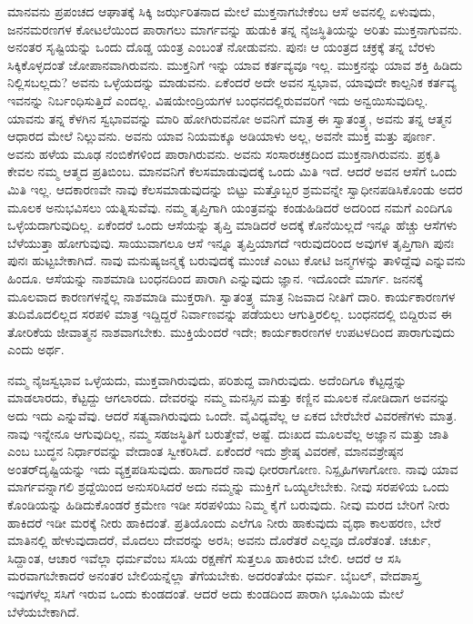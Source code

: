ಮಾನವನು ಪ್ರಪಂಚದ ಆಘಾತಕ್ಕೆ ಸಿಕ್ಕಿ ಜರ್ಝರಿತನಾದ ಮೇಲೆ ಮುಕ್ತನಾಗಬೇಕೆಂಬ ಆಸೆ ಅವನಲ್ಲಿ ಏಳುವುದು, ಜನನಮರಣಗಳ ಕೋಟಲೆಯಿಂದ ಪಾರಾಗಲು ಮಾರ್ಗವನ್ನು ಹುಡುಕಿ ತನ್ನ ನೈಜಸ್ಥಿತಿಯನ್ನು ಅರಿತು ಮುಕ್ತನಾಗುವನು. ಅನಂತರ ಸೃಷ್ಟಿಯನ್ನು ಒಂದು ದೊಡ್ಡ ಯಂತ್ರ ಎಂಬಂತೆ ನೋಡುವನು. ಪುನಃ ಆ ಯಂತ್ರದ ಚಕ್ರಕ್ಕೆ ತನ್ನ ಬೆರಳು ಸಿಕ್ಕಿಕೊಳ್ಳದಂತೆ ಜೋಪಾನವಾಗಿರುವನು. ಮುಕ್ತನಿಗೆ ಇನ್ನು ಯಾವ ಕರ್ತವ್ಯವೂ ಇಲ್ಲ. ಮುಕ್ತನನ್ನು ಯಾವ ಶಕ್ತಿ ಹಿಡಿದು ನಿಲ್ಲಿಸಬಲ್ಲದು? ಅವನು ಒಳ್ಳೆಯದನ್ನು ಮಾಡುವನು. ಏಕೆಂದರೆ ಅದೇ ಅವನ ಸ್ವಭಾವ, ಯಾವುದೇ ಕಾಲ್ಪನಿಕ ಕರ್ತವ್ಯ ಇವನನ್ನು ನಿರ್ಬಂಧಿಸುತ್ತಿದೆ ಎಂದಲ್ಲ. ವಿಷಯೇಂದ್ರಿಯಗಳ ಬಂಧನದಲ್ಲಿರುವವರಿಗೆ ಇದು ಅನ್ವಯಿಸುವುದಿಲ್ಲ. ಯಾವನು ತನ್ನ ಕೆಳಗಿನ ಸ್ವಭಾವವನ್ನು ಮಾರಿ ಹೋಗಿರುವನೋ ಅವನಿಗೆ ಮಾತ್ರ ಈ ಸ್ವಾತಂತ್ರ್ಯ, ಅವನು ತನ್ನ ಆತ್ಮನ ಆಧಾರದ ಮೇಲೆ ನಿಲ್ಲುವನು. ಅವನು ಯಾವ ನಿಯಮಕ್ಕೂ ಅಡಿಯಾಳು ಅಲ್ಲ, ಅವನೇ ಮುಕ್ತ ಮತ್ತು ಪೂರ್ಣ. ಅವನು ಹಳೆಯ ಮೂಢ ನಂಬಿಕೆಗಳಿಂದ ಪಾರಾಗಿರುವನು. ಅವನು ಸಂಸಾರಚಕ್ರದಿಂದ ಮುಕ್ತನಾಗಿರುವನು. ಪ್ರಕೃತಿ ಕೇವಲ ನಮ್ಮ ಆತ್ಮದ ಪ್ರತಿಬಿಂಬ. ಮಾನವನಿಗೆ ಕೆಲಸಮಾಡುವುದಕ್ಕೆ ಒಂದು ಮಿತಿ ಇದೆ. ಆದರೆ ಅವನ ಆಸೆಗೆ ಒಂದು ಮಿತಿ ಇಲ್ಲ. ಆದಕಾರಣವೇ ನಾವು ಕೆಲಸಮಾಡುವುದನ್ನು ಬಿಟ್ಟು ಮತ್ತೊಬ್ಬರ ಶ್ರಮವನ್ನೇ ಸ್ವಾಧೀನಪಡಿಸಿಕೊಂಡು ಅದರ ಮೂಲಕ ಅನುಭವಿಸಲು ಯತ್ನಿಸುವೆವು. ನಮ್ಮ ತೃಪ್ತಿಗಾಗಿ ಯಂತ್ರವನ್ನು ಕಂಡುಹಿಡಿದರೆ ಅದರಿಂದ ನಮಗೆ ಎಂದಿಗೂ ಒಳ್ಳೆಯದಾಗುವುದಿಲ್ಲ. ಏಕೆಂದರೆ ಒಂದು ಆಸೆಯನ್ನು ತೃಪ್ತಿ ಮಾಡಿದರೆ ಅದಕ್ಕೆ ಕೊನೆಯಿಲ್ಲದೆ ಇನ್ನೂ ಹೆಚ್ಚು ಆಸೆಗಳು ಬೆಳೆಯುತ್ತಾ ಹೋಗುವುವು. ಸಾಯುವಾಗಲೂ ಆಸೆ ಇನ್ನೂ ತೃಪ್ತಿಯಾಗದೆ ಇರುವುದರಿಂದ ಅವುಗಳ ತೃಪ್ತಿಗಾಗಿ ಪುನಃ ಪುನಃ ಹುಟ್ಟಬೇಕಾಗಿದೆ. ನಾವು ಮನುಷ್ಯಜನ್ಮಕ್ಕೆ ಬರುವುದಕ್ಕೆ ಮುಂಚೆ ಎಂಟು ಕೋಟಿ ಜನ್ಮಗಳನ್ನು ತಾಳಿದ್ದೆವು ಎನ್ನುವನು ಹಿಂದೂ. ಆಸೆಯನ್ನು ನಾಶಮಾಡಿ ಬಂಧನದಿಂದ ಪಾರಾಗಿ ಎನ್ನುವುದು ಜ್ಞಾನ. ಇದೊಂದೇ ಮಾರ್ಗ. ಜನನಕ್ಕೆ ಮೂಲವಾದ ಕಾರಣಗಳನ್ನೆಲ್ಲ ನಾಶಮಾಡಿ ಮುಕ್ತರಾಗಿ. ಸ್ವಾತಂತ್ರ್ಯ ಮಾತ್ರ ನಿಜವಾದ ನೀತಿಗೆ ದಾರಿ. ಕಾರ್ಯಕಾರಣಗಳ ತುದಿಮೊದಲಿಲ್ಲದ ಸರಪಳಿ ಮಾತ್ರ ಇದ್ದಿದ್ದರೆ ನಿರ್ವಾಣವನ್ನು ಪಡೆಯಲು ಆಗುತ್ತಿರಲಿಲ್ಲ. ಬಂಧನದಲ್ಲಿ ಬಿದ್ದಿರುವ ಈ ತೋರಿಕೆಯ ಜೀವಾತ್ಮನ ನಾಶವಾಗಬೇಕು. ಮುಕ್ತಿಯೆಂದರೆ ಇದೇ; ಕಾರ್ಯಕಾರಣಗಳ ಉಪಟಳದಿಂದ ಪಾರಾಗುವುದು ಎಂದು ಅರ್ಥ.

ನಮ್ಮ ನೈಜಸ್ವಭಾವ ಒಳ್ಳೆಯದು, ಮುಕ್ತವಾಗಿರುವುದು, ಪರಿಶುದ್ದ ವಾಗಿರುವುದು. ಅದೆಂದಿಗೂ ಕೆಟ್ಟದ್ದನ್ನು ಮಾಡಲಾರದು, ಕೆಟ್ಟದ್ದು ಆಗಲಾರದು. ದೇವರನ್ನು ನಮ್ಮ ಮನಸ್ಸಿನ ಮತ್ತು ಕಣ್ಣಿನ ಮೂಲಕ ನೋಡಿದಾಗ ಅವನನ್ನು ಅದು ಇದು ಎನ್ನುವೆವು. ಆದರೆ ಸತ್ಯವಾಗಿರುವುದು ಒಂದೇ. ವೈವಿಧ್ಯವೆಲ್ಲ ಆ ಏಕದ ಬೇರೆಬೇರೆ ವಿವರಣೆಗಳು ಮಾತ್ರ. ನಾವು ಇನ್ನೇನೂ ಆಗುವುದಿಲ್ಲ, ನಮ್ಮ ಸಹಜಸ್ಥಿತಿಗೆ ಬರುತ್ತೇವೆ, ಅಷ್ಟೆ. ದುಃಖದ ಮೂಲವೆಲ್ಲ ಅಜ್ಞಾನ ಮತ್ತು ಜಾತಿ ಎಂಬ ಬುದ್ಧನ ನಿರ್ಧಾರವನ್ನು ವೇದಾಂತ ಸ್ವೀಕರಿಸಿದೆ. ಏಕೆಂದರೆ ಇದು ಶ್ರೇಷ್ಠ ವಿವರಣೆ, ಮಾನವಶ್ರೇಷ್ಠನ ಅಂತರ್‌ದೃಷ್ಟಿಯನ್ನು ಇದು ವ್ಯಕ್ತಪಡಿಸುವುದು. ಹಾಗಾದರೆ ನಾವು ಧೀರರಾಗೋಣ. ನಿಸ್ಪೃಹಿಗಳಾಗೋಣ. ನಾವು ಯಾವ ಮಾರ್ಗವನ್ನಾಗಲಿ ಶ್ರದ್ದೆಯಿಂದ ಅನುಸರಿಸಿದರೆ ಅದು ನಮ್ಮನ್ನು ಮುಕ್ತಿಗೆ ಒಯ್ಯಲೇಬೇಕು. ನೀವು ಸರಪಳಿಯ ಒಂದು ಕೊಂಡಿಯನ್ನು ಹಿಡಿದುಕೊಂಡರೆ ಕ್ರಮೇಣ ಇಡೀ ಸರಪಳಿಯು ನಿಮ್ಮ ಕೈಗೆ ಬರುವುದು. ನೀವು ಮರದ ಬೇರಿಗೆ ನೀರು ಹಾಕಿದರೆ ಇಡೀ ಮರಕ್ಕೆ ನೀರು ಹಾಕಿದಂತೆ. ಪ್ರತಿಯೊಂದು ಎಲೆಗೂ ನೀರು ಹಾಕುವುದು ವೃಥಾ ಕಾಲಹರಣ, ಬೇರೆ ಮಾತಿನಲ್ಲಿ ಹೇಳುವುದಾದರೆ, ಮೊದಲು ದೇವರನ್ನು ಅರಸಿ; ಅವನು ದೊರೆತರೆ ಎಲ್ಲವೂ ದೊರೆತಂತೆ. ಚರ್ಚು, ಸಿದ್ದಾಂತ, ಆಚಾರ ಇವೆಲ್ಲಾ ಧರ್ಮವೆಂಬ ಸಸಿಯ ರಕ್ಷಣೆಗೆ ಸುತ್ತಲೂ ಹಾಕಿರುವ ಬೇಲಿ. ಆದರೆ ಆ ಸಸಿ ಮರವಾಗಬೇಕಾದರೆ ಅನಂತರ ಬೇಲಿಯನ್ನೆಲ್ಲಾ ತೆಗೆಯಬೇಕು. ಅದರಂತೆಯೇ ಧರ್ಮ. ಬೈಬಲ್, ವೇದಶಾಸ್ತ್ರ ಇವುಗಳೆಲ್ಲ ಸಸಿಗೆ ಇರುವ ಒಂದು ಕುಂಡದಂತೆ. ಆದರೆ ಅದು ಕುಂಡದಿಂದ ಪಾರಾಗಿ ಭೂಮಿಯ ಮೇಲೆ ಬೆಳೆಯಬೇಕಾಗಿದೆ.

